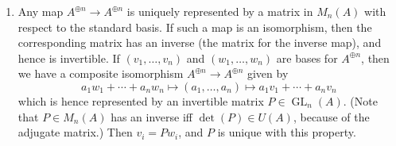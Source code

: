\documentclass{report}
\DeclareMathOperator{\GL}{GL}
\begin{document}
\begin{enumerate}[label=\textbf{6.7.\Alph*.}]
	\item Any map $A^{\oplus n}\to A^{\oplus n}$ is uniquely represented by a
	      matrix in $M_n(A)$ with respect to the standard basis. If such a map is
	      an isomorphism, then the corresponding matrix has an inverse (the matrix
	      for the inverse map), and hence is invertible. If $(v_1,\ldots,v_n)$
	      and $(w_1,\ldots,w_n)$ are bases for $A^{\oplus n}$, then we have a
	      composite isomorphism $A^{\oplus n}\to A^{\oplus n}$ given by
	      \begin{equation*}
		      a_1w_1+\cdots+a_nw_n
		      \mapsto (a_1,\ldots,a_n)
		      \mapsto a_1v_1+\cdots+a_nv_n
	      \end{equation*}
	      which is hence represented by an invertible matrix $P\in\GL_n(A)$. (Note
	      that $P\in M_n(A)$ has an inverse iff $\det(P)\in U(A)$, because of the
	      adjugate matrix.) Then $v_i=Pw_i$, and $P$ is unique with this property.


\end{enumerate}
\end{document}
